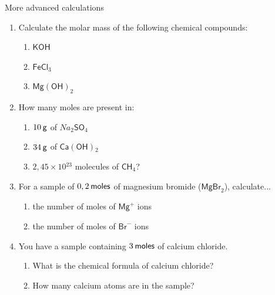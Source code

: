             \begin{exercises}{  More advanced calculations
      }
            \nopagebreak
      \label{m38717*id279756}\begin{enumerate}[noitemsep, label=\textbf{\arabic*}. ] 
            \label{m38717*uid47}\item Calculate the molar mass of the following chemical compounds:
\label{m38717*id279772}\begin{enumerate}[noitemsep, label=\textbf{\alph*}. ] 
            \label{m38717*uid48}\item $\mathsf{KOH}$
\label{m38717*uid49}\item $\mathsf{FeCl}{}_{3}$\label{m38717*uid50}\item ${\mathsf{Mg(OH)}}_{2}$\end{enumerate}
                \label{m38717*uid51}\item How many moles are present in:
\label{m38717*id279848}\begin{enumerate}[noitemsep, label=\textbf{\alph*}. ] 
            \label{m38717*uid52}\item $10\phantom{\rule{2pt}{0ex}}\mathsf{g}$ of $Na{}_{2}\mathsf{SO}{}_{4}$\label{m38717*uid53}
\item $34\phantom{\rule{2pt}{0ex}}\mathsf{g}$ of $\mathsf{Ca(OH)}{}_{2}$\label{m38717*uid54}
\item $2,45\ensuremath{\times}10{}^{23}$ molecules of $\mathsf{CH}{}_{4}$?
\end{enumerate}
                \label{m38717*uid55}\item For a sample of $0,2\phantom{\rule{2pt}{0ex}}\mathsf{moles}$ of magnesium bromide ($\mathsf{MgBr}_{2}$), calculate...
\label{m38717*id279964}\begin{enumerate}[noitemsep, label=\textbf{\alph*}. ] 
            \label{m38717*uid56}\item the number of moles of ${\mathsf{Mg}}^{+}$ ions
\label{m38717*uid57}\item the number of moles of ${\mathsf{Br}}^{-}$ ions
\end{enumerate}
                \label{m38717*uid58}\item You have a sample containing $3\phantom{\rule{2pt}{0ex}}\mathsf{moles}$ of calcium chloride.
\label{m38717*id280031}\begin{enumerate}[noitemsep, label=\textbf{\alph*}. ] 
            \label{m38717*uid59}\item What is the chemical formula of calcium chloride?
\label{m38717*uid60}\item How many calcium atoms are in the sample?

\end{enumerate}
\end{enumerate}
\end{exercises}
